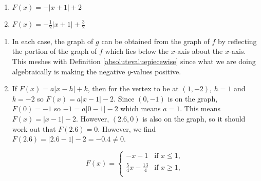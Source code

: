 \documentclass{ximera}
\begin{document}
\begin{multicols}{2}

\begin{enumerate}

\setcounter{enumi}{\value{HW}}

\item $F(x) = -|x+1|+2$  

\item $F(x) = -\frac{1}{2} |x+1|+\frac{3}{2}$

\setcounter{HW}{\value{enumi}}

\end{enumerate}

\end{multicols}

\begin{enumerate}
\setcounter{enumi}{\value{HW}}

\item  In each case, the graph of $g$ can be obtained from the graph of $f$ by reflecting the portion of the graph of $f$ which lies below the $x$-axis about the $x$-axis.  This meshes with Definition \ref{absolutevaluepiecewise} since what we are doing algebraically is making the negative $y$-values positive.

\newpage

\item  If $F(x) = a|x-h| + k$, then for the vertex to be at $(1,-2)$, $h  =1$ and $k = -2$ so $F(x) = a |x-1| - 2$.  Since $(0,-1)$ is on the graph, $F(0) = -1$ so $-1 = a|0-1|-2$ which means $a = 1$.  This means $F(x) = |x-1|-2$.  However, $(2.6,0)$ is also on the graph, so it should work out that $F(2.6) = 0$.  However, we find $F(2.6) = |2.6-1| - 2 = -0.4 \neq 0$.  

 \[ F(x) =  \begin{cases} 
 -x-1 &  \text{if $x \leq 1$, } \\
   \frac{5}{4} x - \frac{13}{4}  & \text{if $x \geq 1$,} \\
  \end{cases}\]
  
\setcounter{HW}{\value{enumi}}
\end{enumerate}
\end{document}
